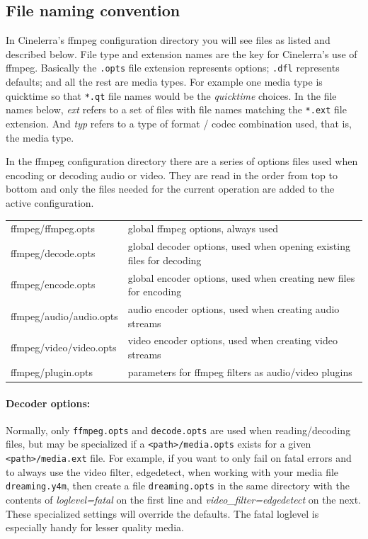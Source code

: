 \subsection{File naming convention}%
\label{sub:file_naming_convention}

In Cinelerra's ffmpeg configuration directory you will see files as listed and described below.  File type and extension names are the key for Cinelerra's use of ffmpeg.  Basically the \texttt{.opts} file extension represents options; \texttt{.dfl} represents defaults; and all the rest are media types.  For example one media type is quicktime so that \texttt{*.qt} file names would be the \textit{quicktime} choices.  In the file names below, \textit{ext} refers to a set of files with file names matching the \texttt{*.ext} file extension.  And \textit{typ} refers to a type of format / codec combination used, that is, the media type.

In the ffmpeg configuration directory there are a series of options files used when encoding or decoding audio or video.  They are read in the order from top to bottom and only the files needed for the current operation are added to the active configuration.

\begin{center}
    \small
    \begin{tabular}{l l}
        \toprule
        ffmpeg/ffmpeg.opts & global ffmpeg options, always used \\
        ffmpeg/decode.opts & global decoder options, used when opening existing files for decoding \\
        ffmpeg/encode.opts & global encoder options, used when creating new files for encoding \\
        ffmpeg/audio/audio.opts & audio encoder options, used when creating audio streams \\
        ffmpeg/video/video.opts & video encoder options, used when creating video streams \\
        ffmpeg/plugin.opts & parameters for ffmpeg filters as audio/video plugins \\
        \bottomrule
    \end{tabular}
\end{center}

\paragraph{Decoder options:} Normally, only \texttt{ffmpeg.opts} and \texttt{decode.opts} are used when reading/decoding files, but may be specialized if a \texttt{<path>/media.opts} exists for a given \texttt{<path>/media.ext} file.  For example, if you want to only fail on fatal errors and to always use the video filter, edgedetect, when working with your media file \texttt{dreaming.y4m}, then create a file \texttt{dreaming.opts} in the same directory with the contents of \textit{loglevel=fatal} on the first line and \textit{video\_filter=edgedetect} on the next.  These specialized settings will override the defaults.  The fatal loglevel is especially handy for lesser quality media.

